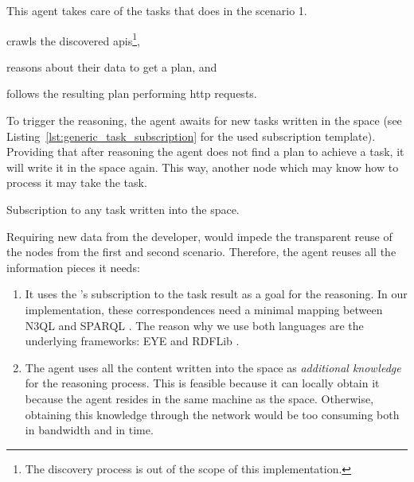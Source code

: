This agent takes care of the tasks that \nodeConsRest{} does in the scenario 1.
\begin{enumerate*}[label=\itshape(\arabic*\upshape)]
  \item crawls the discovered \acsp{api}\footnote{The discovery process is out of the scope of this implementation.},
  \item reasons about their data to get a plan, and
  \item follows the resulting plan performing \acs{http} requests.
\end{enumerate*}
To trigger the reasoning, the agent awaits for new tasks written in the space (see Listing~\ref{lst:generic_task_subscription} for the used subscription template).
Providing that after reasoning the agent does not find a plan to achieve a task, it will write it in the space again.
This way, another node which may know how to process it may take the task. %


\begin{listing}
  
  \caption{Subscription to any task written into the space.}
  \label{lst:generic_task_subscription}
\end{listing}


Requiring new data from the developer, would impede the transparent reuse of the nodes from the first and second scenario.
Therefore, the agent reuses all the information pieces it needs:
\begin{enumerate}
  \item It uses the \nodeConsSpace{}'s subscription to the task result as a goal for the reasoning.
	In our implementation, these correspondences need a minimal mapping between N3QL  and SPARQL .
	The reason why we use both languages are the underlying frameworks: EYE  and RDFLib . %
  \item The agent uses all the content written into the space as \emph{additional knowledge} for the reasoning process.
	This is feasible because it can locally obtain it because the agent resides in the same machine as the space.
	Otherwise, obtaining this knowledge through the network would be too consuming both in bandwidth and in time.
\end{enumerate}




